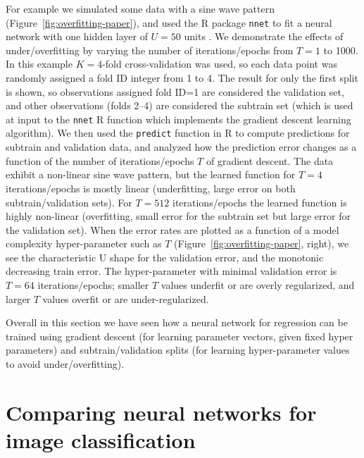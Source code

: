 \documentclass[12pt]{article}
\begin{document}
For example we simulated some data with a sine wave pattern
(Figure~\ref{fig:overfitting-paper}), and used the R package
\texttt{nnet} to fit a neural network with one hidden layer of $U=50$
units \citep{Ripley2002}. We demonstrate the effects of
under/overfitting by varying the number of iterations/epochs from
$T=1$ to 1000. In this example $K=4$-fold cross-validation was used,
so each data point was randomly assigned a fold ID integer from 1 to
4. The result for only the first split is shown, so observations
assigned fold ID=1 are considered the validation set, and other
observations (folds 2--4) are considered the subtrain set (which is
used at input to the \texttt{nnet} R function which implements the
gradient descent learning algorithm). We then used the
\texttt{predict} function in R to compute predictions for subtrain and
validation data, and analyzed how the prediction error changes as a
function of the number of iterations/epochs $T$ of gradient
descent. The data exhibit a non-linear sine wave pattern, but the
learned function for $T=4$ iterations/epochs is mostly linear
(underfitting, large error on both subtrain/validation sets). For
$T=512$ iterations/epochs the learned function is highly non-linear
(overfitting, small error for the subtrain set but large error for the
validation set). When the error rates are plotted as a function of a
model complexity hyper-parameter such as $T$
(Figure~\ref{fig:overfitting-paper}, right), we see the characteristic
U shape for the validation error, and the monotonic decreasing train
error. The hyper-parameter with minimal validation error is $T=64$
iterations/epochs; smaller $T$ values underfit or are overly
regularized, and larger $T$ values overfit or are under-regularized.

Overall in this section we have seen how a neural network for
regression can be trained using gradient descent (for learning
parameter vectors, given fixed hyper parameters) and
subtrain/validation splits (for learning hyper-parameter values to
avoid under/overfitting).

\section{Comparing neural networks for image classification}
\end{document}
